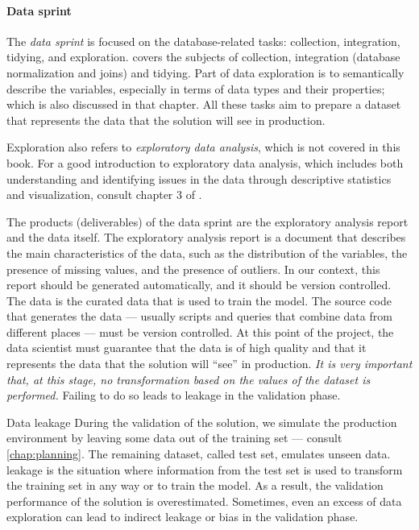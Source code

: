 \paragraph{Data sprint}
The \emph{data sprint} is focused on the database-related tasks: collection, integration, tidying, and
exploration.   covers the subjects of collection, integration (database
normalization and joins) and tidying.  Part of data exploration is to semantically describe
the variables, especially in terms of data types and their properties; which is also
discussed in that chapter.  All these tasks aim to prepare a dataset that represents
the data that the solution will see in production.

Exploration also refers to \emph{exploratory
data analysis}, which is not covered in this book. %
For a good introduction to exploratory data analysis, which includes both understanding
and identifying issues in the data through descriptive statistics and visualization, consult chapter 3 of
\textcite{Zumel2019}.

The products (deliverables) of the data sprint are the exploratory analysis report and the
data itself.  The exploratory analysis report is a document that describes the main
characteristics of the data, such as the distribution of the variables, the presence of
missing values, and the presence of outliers.  In our context, this report should be
generated automatically, and it should be version controlled.  The data is the curated
data that is used to train the model.  The source code that generates the data ---
usually scripts and queries that combine data from different places --- must be version
controlled.  At this point of the project, the data scientist must guarantee that the data
is of high quality and that it represents the data that the solution will ``see'' in
production.  \emph{It is very important that, at this stage, no transformation based
on the values of the dataset is performed.}  Failing to do so leads to \gls{leakage} in
the validation phase.

\begin{defbox}{Data leakage}{}
  During the validation of the solution, we simulate the production environment by leaving
  some data out of the training set --- consult \cref{chap:planning}.  The remaining
  dataset, called test set, emulates unseen data.  \Gls{leakage} is the situation where
  information from the test set is used to transform the training set in any way or to
  train the model.  As a result, the validation performance of the solution is
  overestimated.  Sometimes, even an excess of data exploration can lead to indirect
  leakage or bias in the validation phase.
\end{defbox}

